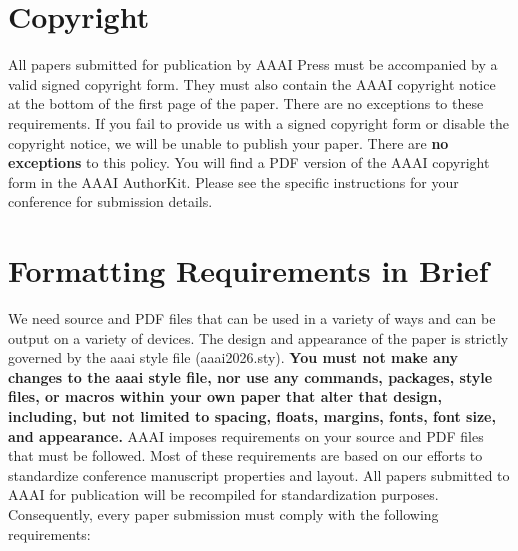 \section{Copyright}\label{copyright}

All papers submitted for publication by AAAI Press must be accompanied
by a valid signed copyright form. They must also contain the AAAI
copyright notice at the bottom of the first page of the paper. There are
no exceptions to these requirements. If you fail to provide us with a
signed copyright form or disable the copyright notice, we will be unable
to publish your paper. There are \textbf{no exceptions} to this policy.
You will find a PDF version of the AAAI copyright form in the AAAI
AuthorKit. Please see the specific instructions for your conference for
submission details.

\section{Formatting Requirements in
Brief}\label{formatting-requirements-in-brief}

We need source and PDF files that can be used in a variety of ways and
can be output on a variety of devices. The design and appearance of the
paper is strictly governed by the aaai style file (aaai2026.sty).
\textbf{You must not make any changes to the aaai style file, nor use
any commands, packages, style files, or macros within your own paper
that alter that design, including, but not limited to spacing, floats,
margins, fonts, font size, and appearance.} AAAI imposes requirements on
your source and PDF files that must be followed. Most of these
requirements are based on our efforts to standardize conference
manuscript properties and layout. All papers submitted to AAAI for
publication will be recompiled for standardization purposes.
Consequently, every paper submission must comply with the following
requirements:

